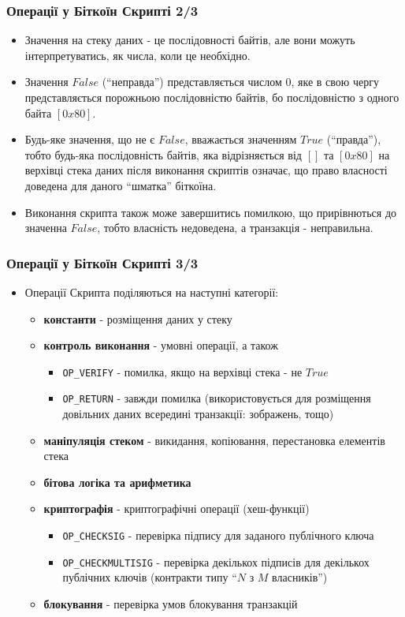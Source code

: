 \documentclass{beamer}
\begin{document}
\begin{frame}[fragile]
  \frametitle{Операції у Біткоїн Скрипті 2/3}
  \begin{itemize}
  \item Значення на стеку даних - це послідовності байтів, але вони можуть
    інтерпретуватись, як числа, коли це необхідно.
  \item Значення $False$ (``неправда'') представляється числом 0, яке в свою
    чергу представляється порожньою послідовністю байтів, бо послідовністю з
    одного байта $[0x80]$.
  \item Будь-яке значення, що не є $False$, вважається значенням $True$
    (``правда''), тобто будь-яка послідовність байтів, яка відрізняється від 
    $[]$ та $[0x80]$ на верхівці стека даних після виконання скриптів означає,
    що право власності доведена для даного ``шматка'' біткоїна.
  \item Виконання скрипта також може завершитись помилкою, що прирівнються до
    значенна $False$, тобто власність недоведена, а транзакція - неправильна.
  \end{itemize}
\end{frame}

\begin{frame}[fragile]
  \frametitle{Операції у Біткоїн Скрипті 3/3}
  \begin{itemize}
  \item Операції Скрипта поділяються на наступні категорії:
    \begin{itemize}
    \item \textbf{константи} - розміщення даних у стеку
    \item \textbf{контроль виконання} - умовні операції, а також
      \begin{itemize}
      \item \texttt{OP_VERIFY} - помилка, якщо на верхівці стека -
        не $True$
      \item \texttt{OP_RETURN} - завжди помилка (використовується
        для розміщення довільних даних всередині транзакції: зображень, тощо)
      \end{itemize}
    \item \textbf{маніпуляція стеком} - викидання, копіювання, перестановка
      елементів стека
    \item \textbf{бітова логіка та арифметика}
    \item \textbf{криптографія} - криптографічні операції (хеш-функції)
      \begin{itemize}
      \item \texttt{OP_CHECKSIG} - перевірка підпису для заданого
        публічного ключа
      \item \texttt{OP_CHECKMULTISIG} - перевірка декількох підписів
        для декількох публічних ключів (контракти типу ``$N$ з $M$ власників'')
      \end{itemize}
    \item \textbf{блокування} - перевірка умов блокування транзакцій
    \end{itemize}
  \end{itemize}
\end{frame}
\end{document}
